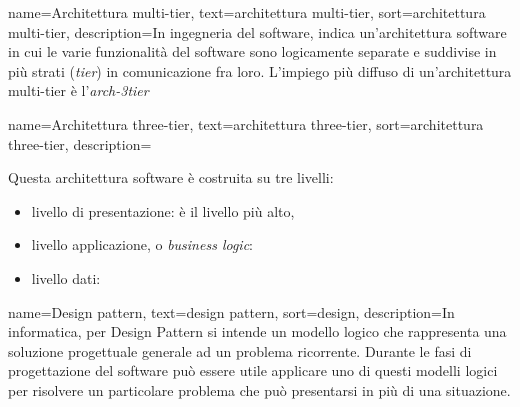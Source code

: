 {
    name=Architettura multi-tier,
    text=architettura multi-tier,
    sort=architettura multi-tier,
    description={In ingegneria del software, indica un'architettura software in cui le varie funzionalità del software sono logicamente separate e suddivise in più strati (\textit{tier}) in comunicazione fra loro. L'impiego più diffuso di un'architettura multi-tier è l'\emph{\gls{arch-3tier}}\glsfirstoccur   
}}

{
    name=Architettura three-tier,
    text=architettura three-tier,
    sort=architettura three-tier,
    description={Questa architettura software è costruita su tre livelli:
        \begin{itemize}
            \item livello di presentazione: è il livello più alto, 
            \item livello applicazione, o \textit{business logic}:
            \item livello dati:
        \end{itemize}
}}

{
    name=Design pattern,
    text=design pattern,
    sort=design,
    description={In informatica, per Design Pattern si intende un modello logico che rappresenta una soluzione progettuale generale ad un problema ricorrente. Durante le fasi di progettazione del software può essere utile applicare uno di questi modelli logici per risolvere un particolare problema che può presentarsi in più di una situazione.
}}


